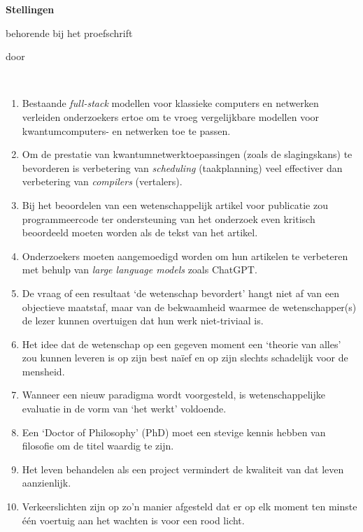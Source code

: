 \begin{center}

{\Large\titlefont\bfseries Stellingen}

\medskip

behorende bij het proefschrift

\medskip

{\makeatletter
\titlestyle\bfseries\large\@title
\makeatother}

{\makeatletter
\ifx\@subtitle\undefined\else
\titlefont\titleshape\@subtitle
\fi
\makeatother}

\medskip

door

\medskip

\makeatletter
{\large\titlefont\bfseries\@firstname\ {\titleshape\@lastname}}
\makeatother

\end{center}


\begin{enumerate}[widest=10]
    \item Bestaande \textit{full-stack} modellen voor klassieke computers en netwerken verleiden onderzoekers ertoe om te vroeg vergelijkbare modellen voor kwantumcomputers- en netwerken toe te passen.
    \item Om de prestatie van kwantumnetwerktoepassingen (zoals de slagingskans) te bevorderen is verbetering van \textit{scheduling} (taakplanning) veel effectiver dan verbetering van \textit{compilers} (vertalers).

    \item Bij het beoordelen van een wetenschappelijk artikel voor publicatie zou programmeercode ter ondersteuning van het onderzoek even kritisch beoordeeld moeten worden als de tekst van het artikel.
    \item Onderzoekers moeten aangemoedigd worden om hun artikelen te verbeteren met behulp van \textit{large language models} zoals ChatGPT.
    \item De vraag of een resultaat `de wetenschap bevordert' hangt niet af van een objectieve maatstaf, maar van de bekwaamheid waarmee de wetenschapper(s) de lezer kunnen overtuigen dat hun werk niet-triviaal is.
    \item Het idee dat de wetenschap op een gegeven moment een `theorie van alles' zou kunnen leveren is op zijn best naïef en op zijn slechts schadelijk voor de mensheid.
    \item Wanneer een nieuw paradigma wordt voorgesteld, is wetenschappelijke evaluatie in de vorm van `het werkt' voldoende.
    \item Een `Doctor of Philosophy' (PhD) moet een stevige kennis hebben van filosofie om de titel waardig te zijn.
    \item Het leven behandelen als een project vermindert de kwaliteit van dat leven aanzienlijk.
    \item Verkeerslichten zijn op zo'n manier afgesteld dat er op elk moment ten minste één voertuig aan het wachten is voor een rood licht.
\end{enumerate}

